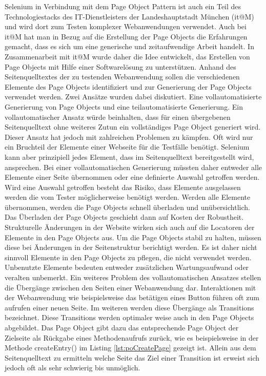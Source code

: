 Selenium in Verbindung mit dem Page Object Pattern ist auch ein Teil des Technologiestacks des IT-Dienstleisters der Landeshauptstadt München (it@M) und wird dort zum Testen komplexer Webanwendungen verwendet. Auch bei it@M hat man in Bezug auf die Erstellung der Page Objects die Erfahrungen gemacht, dass es sich um eine generische und zeitaufwendige Arbeit handelt.
In Zusammenarbeit mit it@M wurde daher die Idee entwickelt, das Erstellen von Page Objects mit Hilfe einer Softwarelösung zu unterstützen. 
Anhand des Seitenquelltextes der zu testenden Webanwendung sollen die verschiedenen Elemente des Page Objects identifiziert und zur Generierung der Page Objects verwendet werden.
Zwei Ansätze wurden dabei diskutiert. Eine vollautomatisierte Generierung von Page Objects und eine teilautomatisierte Generierung.
Ein vollautomatischer Ansatz würde beinhalten, dass für einen übergebenen Seitenquelltext ohne weiteres Zutun ein vollständiges Page Object generiert wird. Dieser Ansatz hat jedoch mit zahlreichen Problemen zu kämpfen. Oft wird nur ein Bruchteil der Elemente einer Webseite für die Testfälle benötigt. Selenium kann aber prinzipiell jedes Element, dass im Seitenquelltext bereitgestellt wird, ansprechen. Bei einer vollautomatischen Generierung müssten daher entweder alle Elemente einer Seite übernommen oder eine definierte Auswahl getroffen werden.
Wird eine Auswahl getroffen besteht das Risiko, dass Elemente ausgelassen werden die vom Tester möglicherweise benötigt werden. Werden alle Elemente übernommen, werden die Page Objects schnell überladen und unübersichtlich. Das Überladen der Page Objects geschieht dann auf Kosten der Robustheit. Strukturelle Änderungen in der Website wirken sich auch auf die Locatoren der Elemente in den Page Objects aus. Um die Page Objects stabil zu halten, müssen diese bei Änderungen in der Seitenstruktur berichtigt werden.
Es ist daher nicht sinnvoll Elemente in den Page Objects zu pflegen, die nicht verwendet werden. Unbenutzte Elemente bedeuten entweder zusätzlichen Wartungsaufwand oder veralten unbemerkt.
Ein weiteres Problem des vollautomatischen Ansatzes stellen die Übergänge zwischen den Seiten einer Webanwendung dar. Interaktionen mit der Webanwendung wie beispielsweise das betätigen eines Button führen oft zum aufrufen einer neuen Seite. Im weiteren werden diese Übergänge als Transitions bezeichnet. Diese Transitions werden optimaler weise auch in den Page Objects abgebildet. Das Page Object gibt dazu das entsprechende Page Object der Zielseite als Rückgabe eines Methodenaufrufs zurück, wie es beispielsweise in der Methode createEntry() im Listing \ref{lst:poCreatePage} gezeigt ist. Allein aus dem Seitenquelltext zu ermitteln welche Seite das Ziel einer Transition ist erweist sich jedoch oft als sehr schwierig bis unmöglich.
